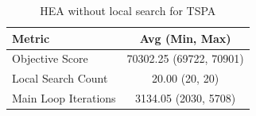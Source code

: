 \begin{table}[h!]
\centering
\begin{tabular}{lc}
\hline
Metric & Avg (Min, Max) \\
\hline
Objective Score & 70302.25 (69722, 70901) \\
Local Search Count & 20.00 (20, 20) \\
Main Loop Iterations & 3134.05 (2030, 5708) \\
\hline
\end{tabular}
\caption{HEA without local search for TSPA}
\label{tab:TSPA_hea_without_ls_scores}
\end{table}

